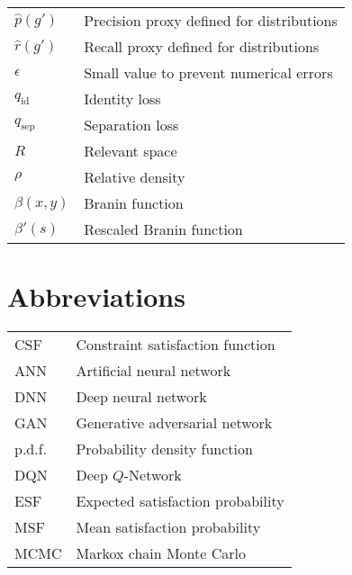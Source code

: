\documentclass[../main.tex]{subfiles}
\begin{document}
\begin{longtable}[l]{ l l }
    $\hat{p}(g')$ & Precision proxy defined for distributions \\
    $\hat{r}(g')$ & Recall proxy defined for distributions \\
    $\epsilon$ & Small value to prevent numerical errors \\
    $q_\text{id}$ & Identity loss \\
    $q_\text{sep}$ & Separation loss \\
    $R$ & Relevant space \\
    $\rho$ & Relative density \\
    $\beta(x,y)$ & Branin function \\
    $\beta'(s)$ & Rescaled Branin function \\
\end{longtable}

\section*{Abbreviations}

\begin{longtable}[l]{ l l }
    CSF & Constraint satisfaction function \\
    ANN & Artificial neural network \\
    DNN & Deep neural network \\
    GAN & Generative adversarial network \\
    p.d.f. & Probability density function \\
    DQN & Deep $Q$-Network \\
    ESF & Expected satisfaction probability \\
    MSF & Mean satisfaction probability \\
    MCMC & Markox chain Monte Carlo \\
\end{longtable}
\end{document}
